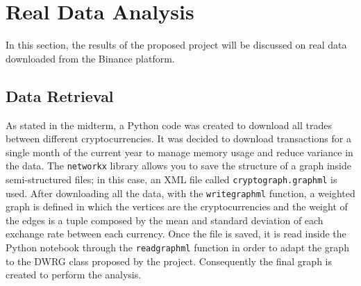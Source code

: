 \section{Real Data Analysis}
In this section, the results of the proposed project will be discussed on real data downloaded from the Binance platform.
\subsection{Data Retrieval}
As stated in the midterm, a Python code was created to download all trades between different cryptocurrencies. It was decided to download transactions for a single month of the current year to manage memory usage and reduce variance in the data.
The \texttt{networkx} library allows you to save the structure of a graph inside semi-structured files; in this case, an XML file called \texttt{crypto\textunderscore graph.graphml} is used. 
After downloading all the data, with the \texttt{write\textunderscore graphml} function, a weighted graph is defined in which the vertices are the cryptocurrencies and the weight of the edges is a tuple composed by the mean and standard deviation of each exchange rate between each currency.
Once the file is saved, it is read inside the Python notebook through the \texttt{read\textunderscore graphml} function in order to adapt the graph to the DWRG class proposed by the project. Consequently the final graph is created to perform the analysis.
